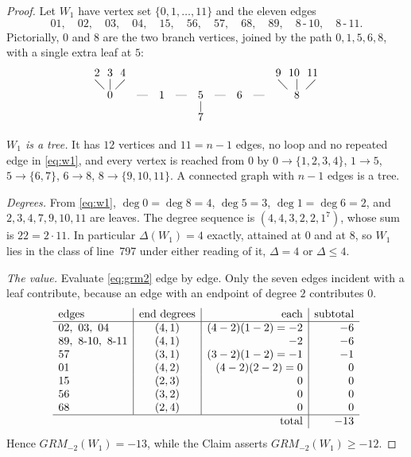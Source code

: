 \documentclass[11pt]{amsart}
\begin{document}
\begin{proof}
Let $W_1$ have vertex set $\{0,1,\dots,11\}$ and the eleven edges
\begin{equation}\label{eq:w1}
  01,\quad 02,\quad 03,\quad 04,\quad 15,\quad 56,\quad 57,\quad
  68,\quad 89,\quad 8\,\text{-}\,10,\quad 8\,\text{-}\,11 .
\end{equation}
Pictorially, $0$ and $8$ are the two branch vertices, joined by the path $0,1,5,6,8$, with a
single extra leaf at $5$:
\[
\begin{array}{ccccccccc}
 2\ \ 3\ \ 4 & & & & & & & & 9\ \ 10\ \ 11\\[-2pt]
 \diagdown\ |\ \diagup & & & & & & & & \diagdown\ \ |\ \ \diagup\\[-2pt]
 0 & \text{---} & 1 & \text{---} & 5 & \text{---} & 6 & \text{---} & 8\\[-2pt]
 & & & & |\\[-2pt]
 & & & & 7
\end{array}
\]

\emph{$W_1$ is a tree.} It has $12$ vertices and $11=n-1$ edges, no loop and no repeated edge
in \eqref{eq:w1}, and every vertex is reached from $0$ by
$0\to\{1,2,3,4\}$, $1\to 5$, $5\to\{6,7\}$, $6\to 8$, $8\to\{9,10,11\}$. A connected graph
with $n-1$ edges is a tree.

\emph{Degrees.} From \eqref{eq:w1}, $\deg 0=\deg 8=4$, $\deg 5=3$, $\deg 1=\deg 6=2$, and
$2,3,4,7,9,10,11$ are leaves. The degree sequence is $(4,4,3,2,2,1^7)$, whose sum is
$22=2\cdot 11$. In particular $\Delta(W_1)=4$ exactly, attained at $0$ and at $8$, so $W_1$
lies in the class of line~797 under either reading of it, $\Delta=4$ or $\Delta\le 4$.

\emph{The value.} Evaluate \eqref{eq:grm2} edge by edge. Only the seven edges incident with a
leaf contribute, because an edge with an endpoint of degree $2$ contributes $0$.
\[
\begin{array}{l|c|r|r}
 \text{edges} & \text{end degrees} & \text{each} & \text{subtotal}\\\hline
 02,\ 03,\ 04 & (4,1) & (4-2)(1-2)=-2 & -6\\
 89,\ 8\text{-}10,\ 8\text{-}11 & (4,1) & -2 & -6\\
 57 & (3,1) & (3-2)(1-2)=-1 & -1\\
 01 & (4,2) & (4-2)(2-2)=0 & 0\\
 15 & (2,3) & 0 & 0\\
 56 & (3,2) & 0 & 0\\
 68 & (2,4) & 0 & 0\\\hline
 \multicolumn{3}{r|}{\text{total}} & -13
\end{array}
\]
Hence $GRM_{-2}(W_1)=-13$, while the Claim asserts $GRM_{-2}(W_1)\ge -12$.
\end{proof}
\end{document}
